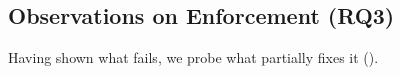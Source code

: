 
\subsection{Observations on Enforcement (RQ3)}
\label{sec:results_robustness}

Having shown what fails, we probe what partially fixes it ().

